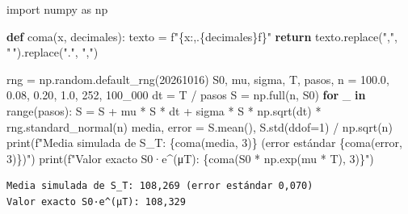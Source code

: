 \documentclass[
  spanish,
  letterpaper,
  a4paper,
  11pt,
  oneside,
  numbers=noenddot]{scrbook}
\newenvironment{Shaded}{\begin{snugshade}}{\end{snugshade}}
\newcommand{\BuiltInTok}[1]{\textcolor[rgb]{0.00,0.23,0.31}{#1}}
\newcommand{\ControlFlowTok}[1]{\textcolor[rgb]{0.00,0.23,0.31}{\textbf{#1}}}
\newcommand{\DecValTok}[1]{\textcolor[rgb]{0.68,0.00,0.00}{#1}}
\newcommand{\FloatTok}[1]{\textcolor[rgb]{0.68,0.00,0.00}{#1}}
\newcommand{\ImportTok}[1]{\textcolor[rgb]{0.00,0.46,0.62}{#1}}
\newcommand{\KeywordTok}[1]{\textcolor[rgb]{0.00,0.23,0.31}{\textbf{#1}}}
\newcommand{\NormalTok}[1]{\textcolor[rgb]{0.00,0.23,0.31}{#1}}
\newcommand{\OperatorTok}[1]{\textcolor[rgb]{0.37,0.37,0.37}{#1}}
\newcommand{\SpecialCharTok}[1]{\textcolor[rgb]{0.37,0.37,0.37}{#1}}
\newcommand{\SpecialStringTok}[1]{\textcolor[rgb]{0.13,0.47,0.30}{#1}}
\newcommand{\StringTok}[1]{\textcolor[rgb]{0.13,0.47,0.30}{#1}}
\theoremstyle{definition}
\theoremstyle{plain}
\theoremstyle{definition}
\theoremstyle{definition}
\theoremstyle{plain}
\theoremstyle{remark}
\begin{document}
\protect{}\label{simulacion-mbg}
\begin{Shaded}
\begin{Highlighting}[]
\ImportTok{import}\NormalTok{ numpy }\ImportTok{as}\NormalTok{ np}

\KeywordTok{def}\NormalTok{ coma(x, decimales):}
\NormalTok{    texto }\OperatorTok{=} \SpecialStringTok{f"}\SpecialCharTok{\{}\NormalTok{x}\SpecialCharTok{:,.}\NormalTok{\{decimales\}f}\SpecialCharTok{\}}\SpecialStringTok{"}
    \ControlFlowTok{return}\NormalTok{ texto.replace(}\StringTok{","}\NormalTok{, }\StringTok{" "}\NormalTok{).replace(}\StringTok{"."}\NormalTok{, }\StringTok{","}\NormalTok{)}

\NormalTok{rng }\OperatorTok{=}\NormalTok{ np.random.default\_rng(}\DecValTok{20261016}\NormalTok{)}
\NormalTok{S0, mu, sigma, T, pasos, n }\OperatorTok{=} \FloatTok{100.0}\NormalTok{, }\FloatTok{0.08}\NormalTok{, }\FloatTok{0.20}\NormalTok{, }\FloatTok{1.0}\NormalTok{, }\DecValTok{252}\NormalTok{, }\DecValTok{100\_000}
\NormalTok{dt }\OperatorTok{=}\NormalTok{ T }\OperatorTok{/}\NormalTok{ pasos}
\NormalTok{S }\OperatorTok{=}\NormalTok{ np.full(n, S0)}
\ControlFlowTok{for}\NormalTok{ \_ }\KeywordTok{in} \BuiltInTok{range}\NormalTok{(pasos):}
\NormalTok{    S }\OperatorTok{=}\NormalTok{ S }\OperatorTok{+}\NormalTok{ mu }\OperatorTok{*}\NormalTok{ S }\OperatorTok{*}\NormalTok{ dt }\OperatorTok{+}\NormalTok{ sigma }\OperatorTok{*}\NormalTok{ S }\OperatorTok{*}\NormalTok{ np.sqrt(dt) }\OperatorTok{*}\NormalTok{ rng.standard\_normal(n)}
\NormalTok{media, error }\OperatorTok{=}\NormalTok{ S.mean(), S.std(ddof}\OperatorTok{=}\DecValTok{1}\NormalTok{) }\OperatorTok{/}\NormalTok{ np.sqrt(n)}
\BuiltInTok{print}\NormalTok{(}\SpecialStringTok{f"Media simulada de S\_T: }\SpecialCharTok{\{}\NormalTok{coma(media, }\DecValTok{3}\NormalTok{)}\SpecialCharTok{\}}\SpecialStringTok{ (error estándar }\SpecialCharTok{\{}\NormalTok{coma(error, }\DecValTok{3}\NormalTok{)}\SpecialCharTok{\}}\SpecialStringTok{)"}\NormalTok{)}
\BuiltInTok{print}\NormalTok{(}\SpecialStringTok{f"Valor exacto S0·e\^{}(μT): }\SpecialCharTok{\{}\NormalTok{coma(S0 }\OperatorTok{*}\NormalTok{ np.exp(mu }\OperatorTok{*}\NormalTok{ T), }\DecValTok{3}\NormalTok{)}\SpecialCharTok{\}}\SpecialStringTok{"}\NormalTok{)}
\end{Highlighting}
\end{Shaded}

\begin{verbatim}
Media simulada de S_T: 108,269 (error estándar 0,070)
Valor exacto S0·e^(μT): 108,329
\end{verbatim}
\end{document}
